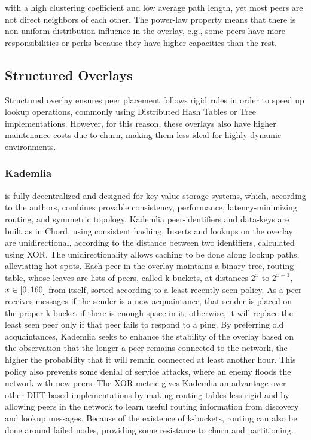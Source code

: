 \documentclass[runningheads]{llncs}
\begin{document}
with a high clustering coefficient and low average path length, yet most peers are not direct neighbors of each other. The power-law property means that there is non-uniform distribution influence in the overlay, e.g., some peers have more responsibilities or perks because they have higher capacities than the rest.

\subsection{Structured Overlays}
Structured overlay ensures peer placement follows rigid rules in order to speed up lookup operations, commonly using Distributed Hash Tables or Tree implementations. However, for this reason, these overlays also have higher maintenance costs due to churn, making them less ideal for highly dynamic environments.

\subsubsection{Kademlia} \cite{kademlia} is fully decentralized and designed for key-value storage systems, which, according to the authors, combines provable consistency, performance, latency-minimizing routing, and symmetric topology. Kademlia peer-identifiers and data-keys are built as in Chord\cite{chord}, using consistent hashing. Inserts and lookups on the overlay are unidirectional, according to the distance between two identifiers, calculated using XOR. The unidirectionality allows caching to be done along lookup paths, alleviating hot spots. Each peer in the overlay maintains a binary tree, routing table, whose leaves are lists of peers, called k-buckets, at distances $2^{x}$ to $2^{x+1}$, $x \in\hspace{1mm}\mathclose[0,160\mathclose]$ from itself, sorted according to a least recently seen policy. As a peer receives messages if the sender is a new acquaintance, that sender is placed on the proper k-bucket if there is enough space in it; otherwise, it will replace the least seen peer only if that peer fails to respond to a ping. By preferring old acquaintances, Kademlia seeks to enhance the stability of the overlay based on the observation that the longer a peer remains connected to the network, the higher the probability that it will remain connected at least another hour\cite{ssaroiu:msp2pfss}. This policy also prevents some denial of service attacks, where an enemy floods the network with new peers. The XOR metric gives Kademlia an advantage over other DHT-based implementations by making routing tables less rigid and by allowing peers in the network to learn useful routing information from discovery and lookup messages. Because of the existence of k-buckets, routing can also be done around failed nodes, providing some resistance to churn and partitioning.
\end{document}
